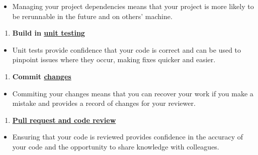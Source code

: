 \documentclass[]{book}
\providecommand{\tightlist}{%
  \setlength{\itemsep}{0pt}\setlength{\parskip}{0pt}}
\begin{document}
\begin{itemize}
\tightlist
\item
  Managing your project dependencies means that your project is more likely to be rerunnable in the future and on others' machine.\\
\end{itemize}

\begin{enumerate}
\def\labelenumi{\arabic{enumi}.}
\setcounter{enumi}{4}
\tightlist
\item
  \textbf{Build in \protect\hyperlink{unittest}{unit testing}}\\
\end{enumerate}

\begin{itemize}
\tightlist
\item
  Unit tests provide confidence that your code is correct and can be used to pinpoint issues where they occur, making fixes quicker and easier.\\
\end{itemize}

\begin{enumerate}
\def\labelenumi{\arabic{enumi}.}
\setcounter{enumi}{5}
\tightlist
\item
  \textbf{Commit \protect\hyperlink{versioncontrol}{changes}}\\
\end{enumerate}

\begin{itemize}
\tightlist
\item
  Commiting your changes means that you can recover your work if you make a mistake and provides a record of changes for your reviewer.\\
\end{itemize}

\begin{enumerate}
\def\labelenumi{\arabic{enumi}.}
\setcounter{enumi}{6}
\tightlist
\item
  \textbf{\protect\hyperlink{review}{Pull request and code review}}\\
\end{enumerate}

\begin{itemize}
\tightlist
\item
  Ensuring that your code is reviewed provides confidence in the accuracy of your code and the opportunity to share knowledge with colleagues.
\end{itemize}
\end{document}

